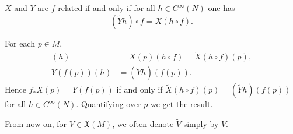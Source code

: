 \documentclass{ximera}
\begin{document}
    \begin{proposition}
        $X$ and $Y$ are $f$-related if and only if for all $h \in C^{\infty}(N)$ one has
        \[     (\tilde{Y}h) \circ f = \tilde{X}( h \circ f).      \]

    
    \begin{solution}    
        For each $p \in M$, 
        \begin{align*}
              [ f_{\ast} X (p) ] (h) & = X(p) (h \circ f)   = \tilde{X} ( h \circ f  ) (p)  , \\
              Y(f(p)) ( h ) & = (\tilde{Y}h) ( f(p)) .
        \end{align*}
        Hence $f_{\ast} X(p) = Y(f(p))$ if and only if $\tilde{X} (h \circ f) (p) = (\tilde{Y}h) ( f(p)) $ for all $h \in C^{\infty}(N)$. Quantifying over $p$ we get the result.
    \end{solution}
        \end{proposition}


    \begin{remark}
        From now on, for $V \in \mathfrak{X}(M)$, we often denote $\tilde{V} $ simply by $V$.
    \end{remark}
    


















































    
\end{document}
